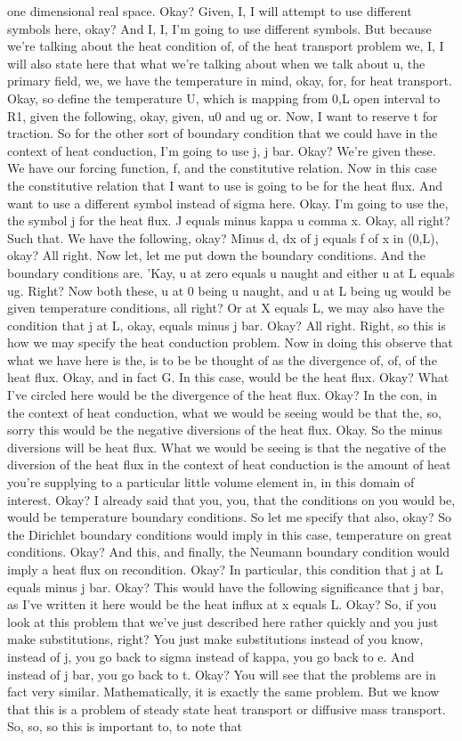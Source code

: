 \documentclass[10pt]{article}
\begin{document}
one dimensional real space. Okay? Given, I, I will attempt to use different symbols here, okay? And I, I, I'm going to use different symbols. But because we're talking about the heat condition of, of the heat transport problem we, I, I will also state here that what we're talking about when we talk about u, the primary field, we, we have the temperature in mind, okay, for, for heat transport. Okay, so define the temperature U, which is mapping from 0,L open interval to R1, given the following, okay, given, u0 and ug or. Now, I want to reserve t for traction. So for the other sort of boundary condition that we could have in the context of heat conduction, I'm going to use j, j bar. Okay? We're given these. We have our forcing function, f, and the constitutive relation. Now in this case the constitutive relation that I want to use is going to be for the heat flux. And want to use a different symbol instead of sigma here. Okay. I'm going to use the, the symbol j for the heat flux. J equals minus kappa u comma x. Okay, all right? Such that. We have the following, okay? Minus d, dx of j equals f of x in (0,L), okay? All right. Now let, let me put down the boundary conditions. And the boundary conditions are. 'Kay, u at zero equals u naught and either u at L equals ug. Right? Now both these, u at 0 being u naught, and u at L being ug would be given temperature conditions, all right? Or at X equals L, we may also have the condition that j at L, okay, equals minus j bar. Okay? All right. Right, so this is how we may specify the heat conduction problem. Now in doing this observe that what we have here is the, is to be be thought of as the divergence of, of, of the heat flux. Okay, and in fact G. In this case, would be the heat flux. Okay? What I've circled here would be the divergence of the heat flux. Okay? In the con, in the context of heat conduction, what we would be seeing would be that the, so, sorry this would be the negative diversions of the heat flux. Okay. So the minus diversions will be heat flux. What we would be seeing is that the negative of the diversion of the heat flux in the context of heat conduction is the amount of heat you're supplying to a particular little volume element in, in this domain of interest. Okay? I already said that you, you, that the conditions on you would be, would be temperature boundary conditions. So let me specify that also, okay? So the Dirichlet boundary conditions would imply in this case, temperature on great conditions. Okay? And this, and finally, the Neumann boundary condition would imply a heat flux on recondition. Okay? In particular, this condition that j at L equals minus j bar. Okay? This would have the following significance that j bar, as I've written it here would be the heat influx at x equals L. Okay? So, if you look at this problem that we've just described here rather quickly and you just make substitutions, right? You just make substitutions instead of you know, instead of j, you go back to sigma instead of kappa, you go back to e. And instead of j bar, you go back to t. Okay? You will see that the problems are in fact very similar. Mathematically, it is exactly the same problem. But we know that this is a problem of steady state heat transport or diffusive mass transport. So, so, so this is important to, to note that 
\end{document}
